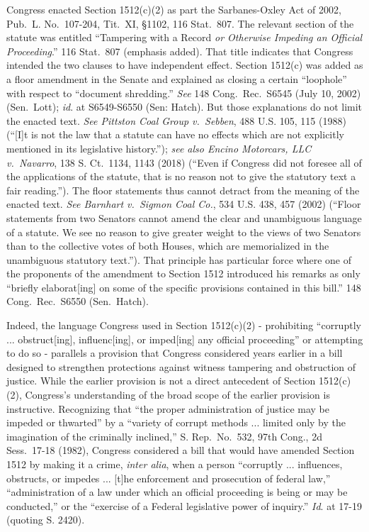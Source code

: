 Congress enacted Section 1512(c)(2) as part the Sarbanes-Oxley Act of 2002, Pub.\ L. No.~107-204, Tit.~XI, \S 1102, 116 Stat.~807.
The relevant section of the statute was entitled “Tampering with a Record \textit{or Otherwise Impeding an Official Proceeding}.”
116 Stat.~807 (emphasis added).
That title indicates that Congress intended the two clauses to have independent effect.
Section 1512(c) was added as a floor amendment in the Senate and explained as closing a certain “loophole” with respect to “document shredding.”
\textit{See} 148 Cong.\ Rec.\ S6545 (July 10, 2002) (Sen.~Lott);
\textit{id}. at S6549-S6550 (Sen: Hatch).
But those explanations do not limit the enacted text.
\textit{See Pittston Coal Group v.\ Sebben}, 488 U.S. 105, 115 (1988) (“[I]t is not the law that a statute can have no effects which are not explicitly mentioned in its legislative history.”);
\textit{see also Encino Motorcars, LLC v.\ Navarro}, 138 S. Ct.~1134, 1143 (2018) (“Even if Congress did not foresee all of the applications of the statute, that is no reason not to give the statutory text a fair reading.”).
The floor statements thus cannot detract from the meaning of the enacted text.
\textit{See Barnhart v.\ Sigmon Coal Co.}, 534 U.S. 438, 457 (2002) (“Floor statements from two Senators cannot amend the clear and unambiguous language of a statute.
We see no reason to give greater weight to the views of two Senators than to the collective votes of both Houses, which are memorialized in the unambiguous statutory text.”).
That principle has particular force where one of the proponents of the amendment to Section 1512 introduced his remarks as only “briefly elaborat[ing] on some of the specific provisions contained in this bill.”
148 Cong.\ Rec.\ S6550 (Sen.~Hatch).

Indeed, the language Congress used in Section 1512(c)(2) - prohibiting “corruptly ... obstruct[ing], influenc[ing], or imped[ing] any official proceeding” or attempting to do so -  parallels a provision that Congress considered years earlier in a bill designed to strengthen protections against witness tampering and obstruction of justice.
While the earlier provision is not a direct antecedent of Section 1512(c)(2), Congress’s understanding of the broad scope of the earlier provision is instructive.
Recognizing that “the proper administration of justice may be impeded or thwarted” by a “variety of corrupt methods ... limited only by the imagination of the criminally inclined,” S. Rep.\ No.~532, 97th Cong., 2d Sess.~17-18 (1982), Congress considered a bill that would have amended Section 1512 by making it a crime, \textit{inter alia}, when a person “corruptly ... influences, obstructs, or impedes ... [t]he enforcement and prosecution of federal law,” “administration of a law under which an official proceeding is being or may be conducted,” or the “exercise of a Federal legislative power of inquiry.” \textit{Id}. at 17-19 (quoting S. 2420).

